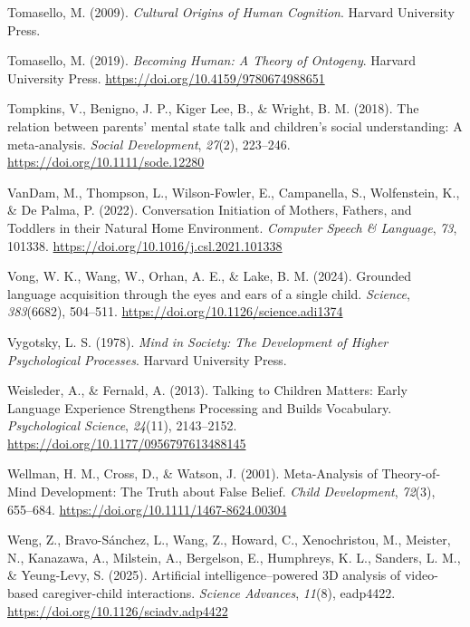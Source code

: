 \documentclass[
  english,
  12pt,
  man,floatsintext]{apa6}
\newlength{\cslhangindent}
\newenvironment{CSLReferences}[2] %
 {\begin{list}{}{%
  \setlength{\itemindent}{0pt}
  \setlength{\leftmargin}{0pt}
  \setlength{\parsep}{0pt}
  \ifodd #1
   \setlength{\leftmargin}{\cslhangindent}
   \setlength{\itemindent}{-1\cslhangindent}
  \fi
  \setlength{\itemsep}{#2\baselineskip}}}
 {\end{list}}
\begin{document}
\begin{CSLReferences}{1}{0}
Tomasello, M. (2009). \emph{Cultural {Origins} of {Human Cognition}}. Harvard University Press.

Tomasello, M. (2019). \emph{Becoming {Human}: {A Theory} of {Ontogeny}}. Harvard University Press. \url{https://doi.org/10.4159/9780674988651}

Tompkins, V., Benigno, J. P., Kiger Lee, B., \& Wright, B. M. (2018). The relation between parents' mental state talk and children's social understanding: {A} meta‐analysis. \emph{Social Development}, \emph{27}(2), 223--246. \url{https://doi.org/10.1111/sode.12280}

VanDam, M., Thompson, L., Wilson-Fowler, E., Campanella, S., Wolfenstein, K., \& De Palma, P. (2022). Conversation {Initiation} of {Mothers}, {Fathers}, and {Toddlers} in their {Natural Home Environment}. \emph{Computer Speech \& Language}, \emph{73}, 101338. \url{https://doi.org/10.1016/j.csl.2021.101338}

Vong, W. K., Wang, W., Orhan, A. E., \& Lake, B. M. (2024). Grounded language acquisition through the eyes and ears of a single child. \emph{Science}, \emph{383}(6682), 504--511. \url{https://doi.org/10.1126/science.adi1374}

Vygotsky, L. S. (1978). \emph{Mind in {Society}: {The Development} of {Higher Psychological Processes}}. Harvard University Press.

Weisleder, A., \& Fernald, A. (2013). Talking to {Children Matters}: {Early Language Experience Strengthens Processing} and {Builds Vocabulary}. \emph{Psychological Science}, \emph{24}(11), 2143--2152. \url{https://doi.org/10.1177/0956797613488145}

Wellman, H. M., Cross, D., \& Watson, J. (2001). Meta-{Analysis} of {Theory}-of-{Mind Development}: {The Truth} about {False Belief}. \emph{Child Development}, \emph{72}(3), 655--684. \url{https://doi.org/10.1111/1467-8624.00304}

Weng, Z., Bravo-Sánchez, L., Wang, Z., Howard, C., Xenochristou, M., Meister, N., Kanazawa, A., Milstein, A., Bergelson, E., Humphreys, K. L., Sanders, L. M., \& Yeung-Levy, S. (2025). Artificial intelligence--powered {3D} analysis of video-based caregiver-child interactions. \emph{Science Advances}, \emph{11}(8), eadp4422. \url{https://doi.org/10.1126/sciadv.adp4422}


\end{CSLReferences}
\end{document}
